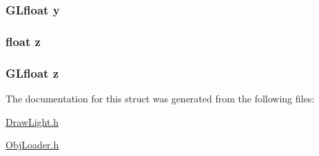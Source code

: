 \hypertarget{struct_vertex_a6a357cf500a8f13fecb5c6f8b684e5b6}{
\subsubsection[{y}]{\setlength{\rightskip}{0pt plus 5cm}G\-Lfloat y}}\label{struct_vertex_a6a357cf500a8f13fecb5c6f8b684e5b6}
\hypertarget{struct_vertex_af73583b1e980b0aa03f9884812e9fd4d}{
\subsubsection[{z}]{\setlength{\rightskip}{0pt plus 5cm}float z}}\label{struct_vertex_af73583b1e980b0aa03f9884812e9fd4d}
\hypertarget{struct_vertex_acfde595878f838c910907ec90d040114}{
\subsubsection[{z}]{\setlength{\rightskip}{0pt plus 5cm}G\-Lfloat z}}\label{struct_vertex_acfde595878f838c910907ec90d040114}


The documentation for this struct was generated from the following files\-:\begin{DoxyCompactItemize}
\item 
\hyperlink{_draw_light_8h}{Draw\-Light.\-h}\item 
\hyperlink{_obj_loader_8h}{Obj\-Loader.\-h}\end{DoxyCompactItemize}
